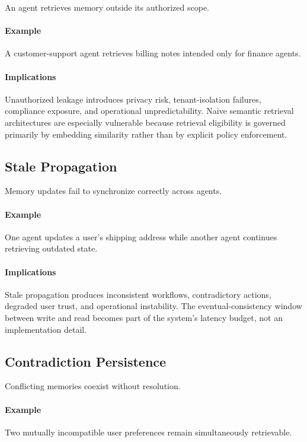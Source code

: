 \documentclass[10pt,twocolumn,letterpaper]{article}
\begin{document}
An agent retrieves memory outside its authorized scope.

\paragraph{Example}
A customer-support agent retrieves billing notes intended only for finance agents.

\paragraph{Implications}
Unauthorized leakage introduces privacy risk, tenant-isolation failures, compliance exposure, and operational unpredictability. Naive semantic retrieval architectures are especially vulnerable because retrieval eligibility is governed primarily by embedding similarity rather than by explicit policy enforcement.

\subsection{Stale Propagation}

Memory updates fail to synchronize correctly across agents.

\paragraph{Example}
One agent updates a user's shipping address while another agent continues retrieving outdated state.

\paragraph{Implications}
Stale propagation produces inconsistent workflows, contradictory actions, degraded user trust, and operational instability. The eventual-consistency window between write and read becomes part of the system's latency budget, not an implementation detail.

\subsection{Contradiction Persistence}

Conflicting memories coexist without resolution.

\paragraph{Example}
Two mutually incompatible user preferences remain simultaneously retrievable.
\end{document}
